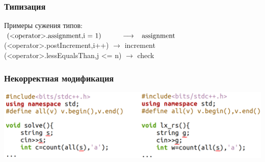 \documentclass[10pt]{beamer}
\begin{document}
\begin{frame}\frametitle{Типизация}
	Примеры сужения типов:\\
	$\text{(<operator>.assignment,i = 1)}\hspace{1cm} \longrightarrow \hspace{0.3cm}\text{assignment}$\\
	(<operator>.postIncrement,i++)\hspace{0.6cm} $\longrightarrow$ \hspace{0.3cm}increment\\
	(<operator>.lessEqualsThan,j <= n) $\longrightarrow$\hspace{0.3cm} check
\end{frame}

\begin{frame}[fragile]\frametitle{Некорректная модификация}
	\centering
	\hspace*{-0.5cm}\includegraphics[scale=0.48]{bad_mod.png}
\end{frame}
\end{document}
